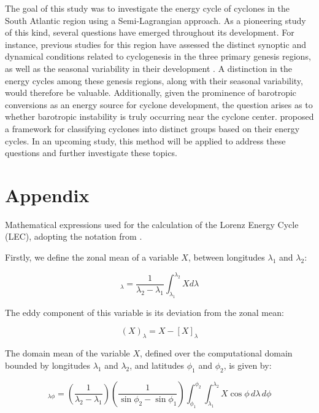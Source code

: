 \documentclass[pdflatex,sn-chicago]{sn-jnl}%
\theoremstyle{plain}
\theoremstyle{definition}
\theoremstyle{remark}
\theoremstyle{definition}
\begin{document}
The goal of this study was to investigate the energy cycle of cyclones in the South Atlantic region using a Semi-Lagrangian approach. As a pioneering study of this kind, several questions have emerged throughout its development. For instance, previous studies for this region have assessed the distinct synoptic and dynamical conditions related to cyclogenesis in the three primary genesis regions, as well as the seasonal variability in their development \citep{gramcianinov2019properties, crespo2021potential}. A distinction in the energy cycles among these genesis regions, along with their seasonal variability, would therefore be valuable. Additionally, given the prominence of barotropic conversions as an energy source for cyclone development, the question arises as to whether barotropic instability is truly occurring near the cyclone center. \citet{souza2024thesis} proposed a framework for classifying cyclones into distinct groups based on their energy cycles. In an upcoming study, this method will be applied to address these questions and further investigate these topics.


\backmatter



\section*{Appendix}


Mathematical expressions used for the calculation of the Lorenz Energy Cycle (LEC), adopting the notation from \citet{michaelides1987limited}. 


Firstly, we define the zonal mean of a variable $X$, between longitudes $\lambda_{1}$ and $\lambda_{2}$:

 \begin{equation}
     [X]_\lambda = \frac{1}{\lambda_2 - \lambda_1} \int_{\lambda_1}^{\lambda_2} X d\lambda
 \end{equation}

The eddy component of this variable is its deviation from the zonal mean:

\begin{equation}
    (X)_\lambda =  X - [X]_\lambda
\end{equation}

The domain mean of the variable $X$, defined over the computational domain bounded by longitudes $\lambda_1$ and $\lambda_2$, and latitudes $\phi_1$ and $\phi_2$, is given by:

\begin{equation}
    [X]_{\lambda\phi} = \left(\frac{1}{\lambda_2 - \lambda_1}\right)  \left(\frac{1}{\sin\phi_2 - \sin\phi_1}\right)  \int_{\phi_1}^{\phi_2} \int_{\lambda_1}^{\lambda_2} X \cos\phi\,d\lambda\,d\phi
\end{equation}
\end{document}
